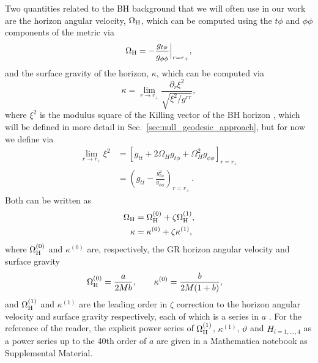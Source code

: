 \documentclass[aps,prx,amsmath,floats,floatfix,twocolumn,
  superscriptaddress,nofootinbib,showpacs]{revtex4-1}
\begin{document}
Two quantities related to the BH background that we will often use in our work are the horizon angular velocity, $\Omega_{\rm H}$, which can be computed using the $t \phi$ and $\phi \phi$ components of the metric via
\begin{equation}
\Omega_{\rm H} = - \frac{g_{t\phi}}{g_{\phi \phi}} \Big|_{r = r_+}, 
\end{equation}
and the surface gravity of the horizon, $\kappa$, which can be computed via 
\begin{equation}
\kappa =\lim_{r \rightarrow r_+} \frac{\partial_r \xi^2}{\sqrt{\xi^2/g^{rr}}},  
\end{equation}
where $\xi^2$ is the modulus square of the Killing vector of the BH horizon \cite{Cano_Ruiperez_2019}, which will be defined in more detail in Sec.~\ref{sec:null_geodesic_approach}, but for now we define via
\begin{equation}
\begin{split}
\lim_{r \rightarrow r_+} \xi^2 & = \left[g_{tt}+2\Omega_H g_{t \phi} + \Omega_{H}^2 g_{\phi \phi}\right]_{r=r_+} \\
& = \left(g_{tt} - \frac{g_{t \phi}^2}{g_{\phi \phi}}\right)_{r=r_+}\,. 
\end{split}
\end{equation}
Both can be written as 
\begin{equation}\label{eq:Omega_H_and_kappa}
\begin{split}
\Omega_{\rm H} & = \Omega^{(0)}_{\rm H} + \zeta \Omega^{(1)}_{\rm H}, \\
\kappa & = \kappa^{(0)} + \zeta \kappa^{(1)}, 
\end{split}
\end{equation}
where $\Omega^{(0)}_{\rm H}$ and $\kappa^{(0)}$ are, respectively, the GR horizon angular velocity and surface gravity 
\begin{equation}
\begin{split}
\Omega^{(0)}_{\rm H} & = \frac{a}{2Mb},  \qquad
\kappa^{(0)} = \frac{b}{2M(1+b)}, 
\end{split}
\end{equation}
and $\Omega^{(1)}_{\rm H}$ and $\kappa^{(1)}$ are the leading order in $\zeta$ correction to the horizon angular velocity and surface gravity respectively, each of which is a series in $a$ \cite{Cano_Ruiperez_2019}. 
For the reference of the reader, the explicit power series of $\Omega^{(1)}_{\rm H}$, $\kappa^{(1)}$, $\vartheta$ and $H_{i=1,...,4}$ as a power series up to the 40th order of $a$ are given in a Mathematica notebook as Supplemental Material. 
\end{document}
